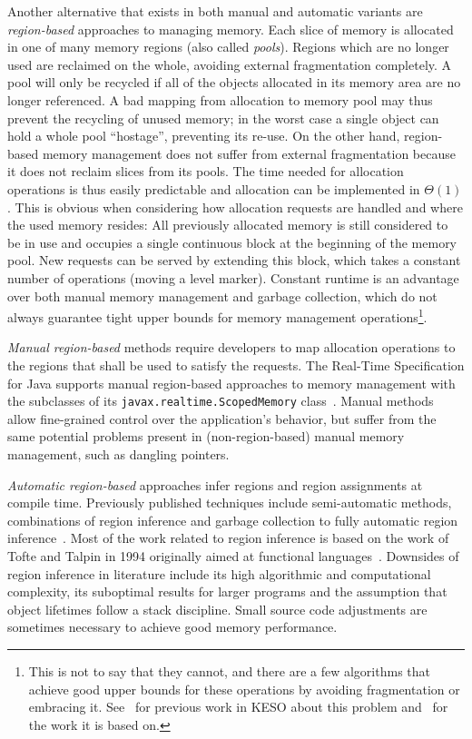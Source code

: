 		Another alternative that exists in both manual and automatic variants are \emph{region-based} approaches to managing
		memory. Each slice of memory is allocated in one of many memory regions (also called \emph{pools}). Regions which
		are no longer used are reclaimed on the whole, avoiding external fragmentation completely. A pool will only be
		recycled if all of the objects allocated in its memory area are no longer referenced. A bad mapping from allocation
		to memory pool may thus prevent the recycling of unused memory; in the worst case a single object can hold a whole
		pool \enquote{hostage}, preventing its re-use. On the other hand, region-based memory management does not suffer
		from external fragmentation because it does not reclaim slices from its pools. The time needed for allocation
		operations is thus easily predictable and allocation can be implemented in $\Theta(1)$. This is obvious when
		considering how allocation requests are handled and where the used memory resides: All previously allocated memory
		is still considered to be in use and occupies a single continuous block at the beginning of the memory pool. New
		requests can be served by extending this block, which takes a constant number of operations (moving a level marker).
		Constant runtime is an advantage over both manual memory management and garbage collection, which do not always
		guarantee tight upper bounds for memory management operations\footnote{This is not to say that they cannot, and
		there are a few algorithms that achieve good upper bounds for these operations by avoiding fragmentation or
		embracing it. See~\cite{strotz:14} for previous work in KESO about this problem and~\cite{pizlo:10:pldi} for the
		work it is based on.}.

		\emph{Manual region-based} methods require developers to map allocation operations to the regions that shall be used
		to satisfy the requests. The Real-Time Specification for Java supports manual region-based approaches to memory
		management with the subclasses of its \texttt{javax.realtime.ScopedMemory} class~\cite{rtsj:06:scoped}. Manual
		methods allow fine-grained control over the application's behavior, but suffer from the same potential problems
		present in (non-region-based) manual memory management, such as dangling pointers.

		\emph{Automatic region-based} approaches infer regions and region assignments at compile time. Previously published
		techniques include semi-automatic methods, combinations of region inference and garbage collection to fully
		automatic region inference~\cite{grossman:02:pldi, hallenberg:02:sigplan, chin:04:pldi}. Most of the work related to
		region inference is based on the work of Tofte and Talpin in 1994 originally aimed at functional
		languages~\cite{tofte:94:popl}. Downsides of region inference in literature include its high algorithmic and
		computational complexity, its suboptimal results for larger programs and the assumption that object lifetimes follow
		a stack discipline. Small source code adjustments are sometimes necessary to achieve good memory
		performance.~\cite{henglein:01:ppdp}

